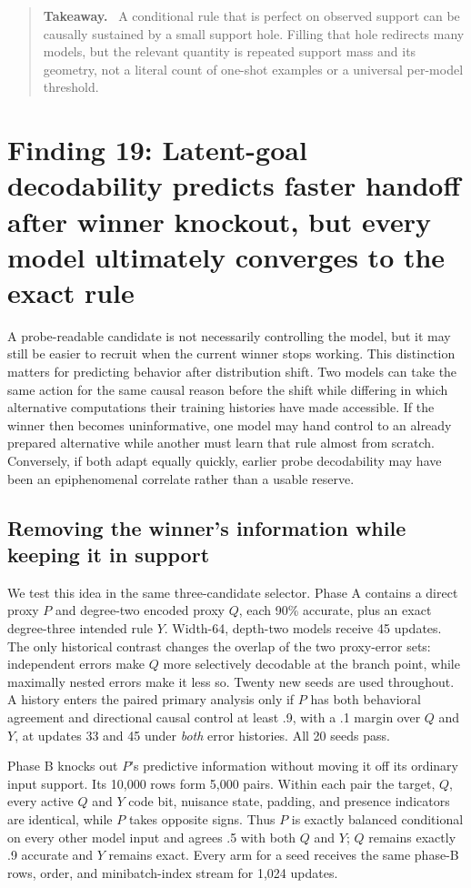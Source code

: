 \documentclass[11pt,a4paper]{article}
\newenvironment{takeaway}{%
  \begin{quote}\small\color{ink}\noindent\textbf{Takeaway.}\ 
}{%
  \end{quote}
}
\begin{document}
\begin{takeaway}
A conditional rule that is perfect on observed support can be causally sustained by a small support hole. Filling that hole redirects many models, but the relevant quantity is repeated support mass and its geometry, not a literal count of one-shot examples or a universal per-model threshold.
\end{takeaway}

\section*{Finding 19: Latent-goal decodability predicts faster handoff after winner knockout, but every model ultimately converges to the exact rule}

A probe-readable candidate is not necessarily controlling the model, but it may still be easier to recruit when the current winner stops working. This distinction matters for predicting behavior after distribution shift. Two models can take the same action for the same causal reason before the shift while differing in which alternative computations their training histories have made accessible. If the winner then becomes uninformative, one model may hand control to an already prepared alternative while another must learn that rule almost from scratch. Conversely, if both adapt equally quickly, earlier probe decodability may have been an epiphenomenal correlate rather than a usable reserve.

\subsection*{Removing the winner's information while keeping it in support}

We test this idea in the same three-candidate selector. Phase A contains a direct proxy $P$ and degree-two encoded proxy $Q$, each 90\% accurate, plus an exact degree-three intended rule $Y$. Width-64, depth-two models receive 45 updates. The only historical contrast changes the overlap of the two proxy-error sets: independent errors make $Q$ more selectively decodable at the branch point, while maximally nested errors make it less so. Twenty new seeds are used throughout. A history enters the paired primary analysis only if $P$ has both behavioral agreement and directional causal control at least .9, with a .1 margin over $Q$ and $Y$, at updates 33 and 45 under \emph{both} error histories. All 20 seeds pass.

Phase B knocks out $P$'s predictive information without moving it off its ordinary input support. Its 10,000 rows form 5,000 pairs. Within each pair the target, $Q$, every active $Q$ and $Y$ code bit, nuisance state, padding, and presence indicators are identical, while $P$ takes opposite signs. Thus $P$ is exactly balanced conditional on every other model input and agrees .5 with both $Q$ and $Y$; $Q$ remains exactly .9 accurate and $Y$ remains exact. Every arm for a seed receives the same phase-B rows, order, and minibatch-index stream for 1,024 updates.
\end{document}
